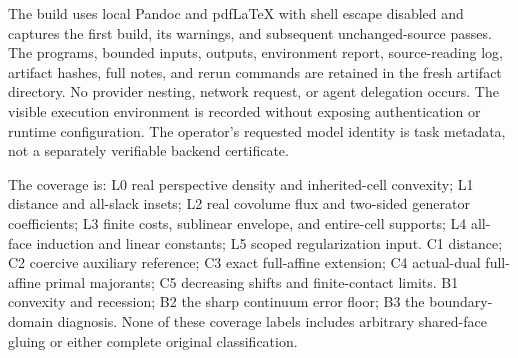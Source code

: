 \documentclass[
  11pt,
]{article}
\begin{document}
The build uses local Pandoc and pdfLaTeX with shell escape disabled and
captures the first build, its warnings, and subsequent unchanged-source
passes. The programs, bounded inputs, outputs, environment report,
source-reading log, artifact hashes, full notes, and rerun commands are
retained in the fresh artifact directory. No provider nesting, network
request, or agent delegation occurs. The visible execution environment
is recorded without exposing authentication or runtime configuration.
The operator's requested model identity is task metadata, not a
separately verifiable backend certificate.

The coverage is: L0 real perspective density and inherited-cell
convexity; L1 distance and all-slack insets; L2 real covolume flux and
two-sided generator coefficients; L3 finite costs, sublinear envelope,
and entire-cell supports; L4 all-face induction and linear constants; L5
scoped regularization input. C1 distance; C2 coercive auxiliary
reference; C3 exact full-affine extension; C4 actual-dual full-affine
primal majorants; C5 decreasing shifts and finite-contact limits. B1
convexity and recession; B2 the sharp continuum error floor; B3 the
boundary-domain diagnosis. None of these coverage labels includes
arbitrary shared-face gluing or either complete original classification.
\end{document}
